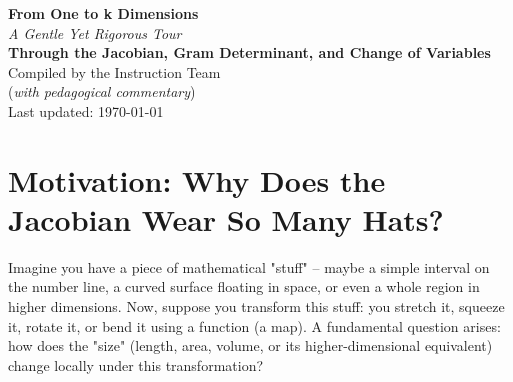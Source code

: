 \documentclass[12pt]{article}
\theoremstyle{definition} %
\theoremstyle{plain} %
\theoremstyle{remark} %
\begin{document}
\begin{titlepage}
    \centering
    \vspace*{2cm} %
    {\Huge\bfseries\sffamily\color{MidnightBlue} From One to k Dimensions}\\[1em]
    {\Large\itshape A Gentle Yet Rigorous Tour}\\[1.5em]
    {\Huge\bfseries\sffamily\color{MidnightBlue} Through the Jacobian, Gram Determinant, and Change of Variables}\\[3em]
    \vfill %
    {\Large Compiled by the Instruction Team}\\
    (\emph{with pedagogical commentary})\\[3em]
    {\large Last updated: \today}
    \vfill %
\end{titlepage}

\tableofcontents
\thispagestyle{empty} %
\newpage
\setcounter{page}{1} %


\section*{Motivation: Why Does the Jacobian Wear So Many Hats?}

Imagine you have a piece of mathematical "stuff" – maybe a simple interval on the number line, a curved surface floating in space, or even a whole region in higher dimensions. Now, suppose you transform this stuff: you stretch it, squeeze it, rotate it, or bend it using a function (a map). A fundamental question arises: how does the "size" (length, area, volume, or its higher-dimensional equivalent) change locally under this transformation?
\end{document}

